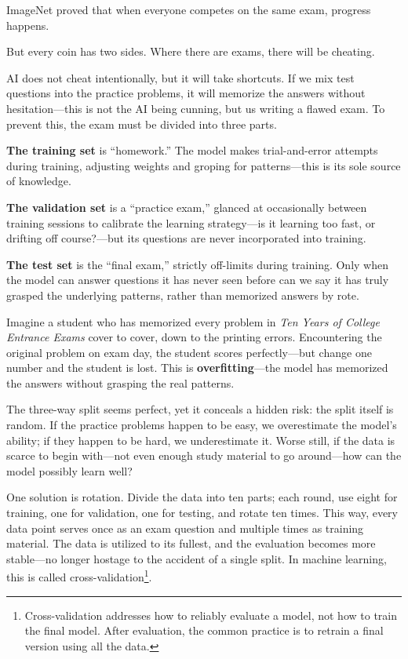 ImageNet proved that when everyone competes on the same exam, progress happens.

But every coin has two sides. Where there are exams, there will be cheating.

AI does not cheat intentionally, but it will take shortcuts. If we mix test questions into the practice problems, it will memorize the answers without hesitation---this is not the AI being cunning, but us writing a flawed exam. To prevent this, the exam must be divided into three parts.

\textbf{The training set} is ``homework.'' The model makes trial-and-error attempts during training, adjusting weights and groping for patterns---this is its sole source of knowledge.

\textbf{The validation set} is a ``practice exam,'' glanced at occasionally between training sessions to calibrate the learning strategy---is it learning too fast, or drifting off course?---but its questions are never incorporated into training.

\textbf{The test set} is the ``final exam,'' strictly off-limits during training. Only when the model can answer questions it has never seen before can we say it has truly grasped the underlying patterns, rather than memorized answers by rote.

Imagine a student who has memorized every problem in \textit{Ten Years of College Entrance Exams} cover to cover, down to the printing errors. Encountering the original problem on exam day, the student scores perfectly---but change one number and the student is lost. This is \textbf{overfitting}---the model has memorized the answers without grasping the real patterns.

\vspace{1em}

The three-way split seems perfect, yet it conceals a hidden risk: the split itself is random.
If the practice problems happen to be easy, we overestimate the model's ability; if they happen to be hard, we underestimate it. Worse still, if the data is scarce to begin with---not even enough study material to go around---how can the model possibly learn well?

\vspace{1em}

One solution is rotation. Divide the data into ten parts; each round, use eight for training, one for validation, one for testing, and rotate ten times. This way, every data point serves once as an exam question and multiple times as training material. The data is utilized to its fullest, and the evaluation becomes more stable---no longer hostage to the accident of a single split. In machine learning, this is called cross-validation\footnote{Cross-validation addresses how to reliably evaluate a model, not how to train the final model. After evaluation, the common practice is to retrain a final version using all the data.}.

